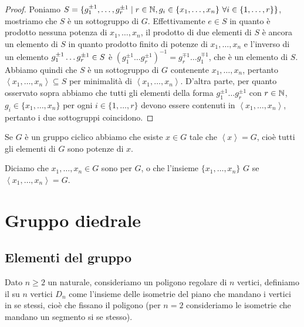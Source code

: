 \documentclass[11pt]{scrartcl}
\begin{document}
\begin{proof}
Poniamo $S = \{g_1^{\pm 1}, \dots, g_r^{\pm 1}\mid r \in \mathbb N, g_i \in \{x_1, \dots, x_n\}
~\forall i \in \{1, \dots, r\}\}$, mostriamo che $S$ è un sottogruppo di $G$. 
Effettivamente $e \in S$ in quanto è prodotto nessuna potenza di $x_1, \dots, x_n$, 
il prodotto di due elementi di $S$ è ancora un elemento di $S$ in quanto
prodotto finito di potenze di $x_1, \dots, x_n$ e l'inverso di un elemento
$g_1^{\pm 1}\dots g_r^{\pm 1} \in\nolinebreak S$ è $(g_1^{\pm 1}\dots 
g_r^{\pm 1})^{-1} = g_r^{\mp 1}\dots g_1^{\mp 1}$, che è un elemento di $S$.
Abbiamo quindi che $S$ è un sottogruppo di $G$ contenente $x_1, \dots, x_n$,
pertanto $\left<x_1, \dots, x_n\right>\subseteq S$ per minimalità di $\left<x_1,
\dots, x_n\right>$. D'altra parte, per quanto osservato sopra abbiamo che
tutti gli elementi della forma $g_1^{\pm 1}\dots g_r^{\pm 1}$ con $r \in \mathbb N$, 
$g_i \in \{x_1, \dots, x_n\}$ per ogni $i \in \{1, \dots, r\}$ devono essere
contenuti in $\left<x_1, \dots, x_n\right>$, pertanto i due sottogruppi
coincidono.
\end{proof}

\begin{remark}
    Se $G$ è un gruppo ciclico abbiamo che esiste $x \in G$ tale che 
    $\left<x\right> = G$, cioè tutti gli elementi di $G$ sono potenze di $x$.
\end{remark}

Diciamo che $x_1, \dots, x_n \in G$ sono  per $G$, o che 
l'insieme $\{x_1, \dots, x_n\}$  $G$ se $\left<x_1, \dots, x_n\right> = G$.



\section{Gruppo diedrale}

\subsection{Elementi del gruppo}

\begin{definition}
    Dato $n \geq 2$ un naturale, consideriamo un poligono regolare di $n$ vertici,
    definiamo il  su $n$ vertici $D_n$ come l'insieme 
    delle isometrie del piano che mandano i vertici in se stessi, cioè che 
    fissano il poligono (per $n = 2$ consideriamo le isometrie che mandano un 
    segmento si se stesso).
\end{definition}
\end{document}
